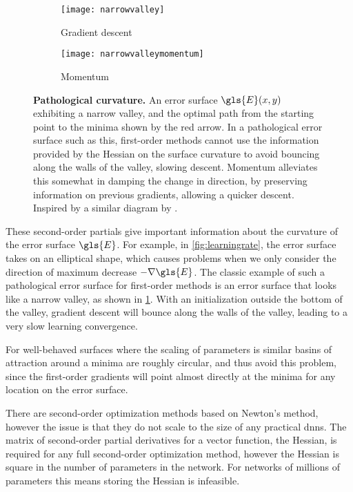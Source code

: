 \documentclass[thesis]{subfiles}
\begin{document}
\begin{figure}[tbp]
\centering
\begin{subfigure}[b]{0.45\textwidth}
\texttt{[image: narrowvalley]}
\caption{Gradient descent}\label{fig:narrowvalleysgd}
\end{subfigure}
\begin{subfigure}[b]{0.45\textwidth}
\texttt{[image: narrowvalleymomentum]}
\caption{Momentum}\label{fig:narrowvalleymomentum}
\end{subfigure}
\caption[Pathological curvature]{\textbf{Pathological curvature.} An error surface $\gls{E}(x, y)$ exhibiting a narrow valley, and the optimal path from the starting point to the minima shown by the red arrow. In a pathological error surface such as this, first-order methods cannot use the information provided by the Hessian on the surface curvature to avoid bouncing along the walls of the valley, slowing descent. Momentum alleviates this somewhat in damping the change in direction, by preserving information on previous gradients, allowing a quicker descent. Inspired by a similar diagram by \citet{martens2010deep}.}
\label{fig:pathological}
\end{figure}
These second-order partials give important information about the curvature of the error surface $\gls{E}$. For example, in \cref{fig:learningrate}, the error surface takes on an elliptical shape, which causes problems when we only consider the direction of maximum decrease $-\nabla \gls{E}$. The classic example of such a pathological error surface for first-order methods is an error surface that looks like a narrow valley, as shown in \cref{fig:narrowvalleysgd}. With an initialization outside the bottom of the valley, gradient descent will bounce along the walls of the valley, leading to a very slow learning convergence.

For well-behaved surfaces where the scaling of parameters is similar
basins of attraction around a minima are roughly circular, and thus avoid this problem, since the first-order gradients will point almost directly at the minima for any location on the error surface.

There are second-order optimization methods based on Newton's method, however the issue is that they do not scale to the size of any practical \glspl{dnn}. The matrix of second-order partial derivatives for a vector function, the Hessian, is required for any full second-order optimization method, however the Hessian is square in the number of parameters in the network. For networks of millions of parameters this means storing the Hessian is infeasible.
\end{document}
